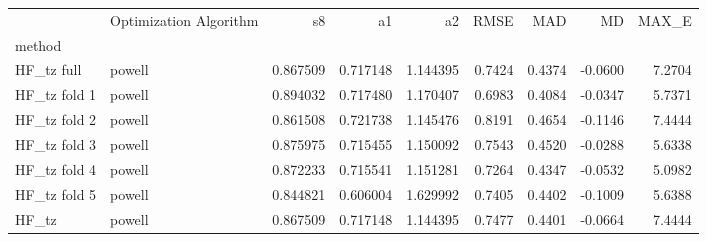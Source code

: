 \begin{tabular}{llrrrrrrr}
 & Optimization Algorithm & s8 & a1 & a2 & RMSE & MAD & MD & MAX_E \\
method &  &  &  &  &  &  &  &  \\
HF_tz full & powell & 0.867509 & 0.717148 & 1.144395 & 0.7424 & 0.4374 & -0.0600 & 7.2704 \\
HF_tz fold 1 & powell & 0.894032 & 0.717480 & 1.170407 & 0.6983 & 0.4084 & -0.0347 & 5.7371 \\
HF_tz fold 2 & powell & 0.861508 & 0.721738 & 1.145476 & 0.8191 & 0.4654 & -0.1146 & 7.4444 \\
HF_tz fold 3 & powell & 0.875975 & 0.715455 & 1.150092 & 0.7543 & 0.4520 & -0.0288 & 5.6338 \\
HF_tz fold 4 & powell & 0.872233 & 0.715541 & 1.151281 & 0.7264 & 0.4347 & -0.0532 & 5.0982 \\
HF_tz fold 5 & powell & 0.844821 & 0.606004 & 1.629992 & 0.7405 & 0.4402 & -0.1009 & 5.6388 \\
HF_tz & powell & 0.867509 & 0.717148 & 1.144395 & 0.7477 & 0.4401 & -0.0664 & 7.4444 \\
\end{tabular}
